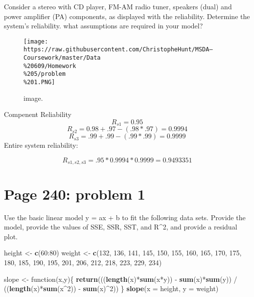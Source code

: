 \documentclass[]{article}
\newenvironment{Shaded}{\begin{snugshade}}{\end{snugshade}}
\newcommand{\KeywordTok}[1]{\textcolor[rgb]{0.13,0.29,0.53}{\textbf{{#1}}}}
\newcommand{\DataTypeTok}[1]{\textcolor[rgb]{0.13,0.29,0.53}{{#1}}}
\newcommand{\DecValTok}[1]{\textcolor[rgb]{0.00,0.00,0.81}{{#1}}}
\newcommand{\StringTok}[1]{\textcolor[rgb]{0.31,0.60,0.02}{{#1}}}
\newcommand{\NormalTok}[1]{{#1}}
\begin{document}
Consider a stereo with CD player, FM-AM radio tuner, speakers (dual) and
power amplifier (PA) components, as displayed with the reliability.
Determine the system's reliability. what assumptions are required in
your model?

\begin{figure}[htbp]
\centering
\texttt{[image: https://raw.githubusercontent.com/ChristopheHunt/MSDA---Coursework/master/Data\\\%20609/Homework\\\%205/problem\\\%201.PNG]}
\caption{image.}
\end{figure}

Compenent Reliability \[R_{s1} = 0.95\]
\[R_{s2} = 0.98 + .97 - (.98 * .97) = 0.9994\]
\[R_{s3} = .99 + .99 - (.99 * .99) = 0.9999\] Entire system reliability:

\[R_{s1, s2, s3} = .95 * 0.9994 * 0.9999 = 0.9493351\]

\section{Page 240: problem 1}\label{page-240-problem-1}

Use the basic linear model y = ax + b to fit the following data sets.
Provide the model, provide the values of SSE, SSR, SST, and R\^{}2, and
provide a residual plot.

\begin{Shaded}
\begin{Highlighting}[]
\NormalTok{height <-}\StringTok{ }\KeywordTok{c}\NormalTok{(}\DecValTok{60}\NormalTok{:}\DecValTok{80}\NormalTok{)}
\NormalTok{weight <-}\StringTok{ }\KeywordTok{c}\NormalTok{(}\DecValTok{132}\NormalTok{, }\DecValTok{136}\NormalTok{, }\DecValTok{141}\NormalTok{, }\DecValTok{145}\NormalTok{, }\DecValTok{150}\NormalTok{, }\DecValTok{155}\NormalTok{, }\DecValTok{160}\NormalTok{, }\DecValTok{165}\NormalTok{, }\DecValTok{170}\NormalTok{, }
            \DecValTok{175}\NormalTok{, }\DecValTok{180}\NormalTok{, }\DecValTok{185}\NormalTok{, }\DecValTok{190}\NormalTok{, }\DecValTok{195}\NormalTok{, }\DecValTok{201}\NormalTok{, }\DecValTok{206}\NormalTok{, }\DecValTok{212}\NormalTok{, }\DecValTok{218}\NormalTok{, }
            \DecValTok{223}\NormalTok{, }\DecValTok{229}\NormalTok{, }\DecValTok{234}\NormalTok{)}
\end{Highlighting}
\end{Shaded}

\begin{Shaded}
\begin{Highlighting}[]
\NormalTok{slope <-}\StringTok{ }\NormalTok{function(x,y)\{}
\KeywordTok{return}\NormalTok{(((}\KeywordTok{length}\NormalTok{(x)*}\KeywordTok{sum}\NormalTok{(x*y)) -}\StringTok{ }\KeywordTok{sum}\NormalTok{(x)*}\KeywordTok{sum}\NormalTok{(y)) /}\StringTok{ }
\StringTok{       }\NormalTok{((}\KeywordTok{length}\NormalTok{(x)*}\KeywordTok{sum}\NormalTok{(x^}\DecValTok{2}\NormalTok{)) -}\StringTok{ }\KeywordTok{sum}\NormalTok{(x)^}\DecValTok{2}\NormalTok{))}
     \NormalTok{\}}
\KeywordTok{slope}\NormalTok{(}\DataTypeTok{x =} \NormalTok{height, }\DataTypeTok{y =} \NormalTok{weight)}
\end{Highlighting}
\end{Shaded}
\end{document}

